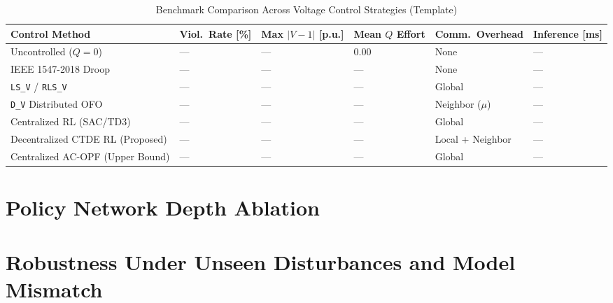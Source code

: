 \begin{table}[!htbp]
\centering
\caption{Benchmark Comparison Across Voltage Control Strategies (Template)}
\label{tab:benchmark_template}
\small
\renewcommand{\arraystretch}{1.12}
\begin{tabularx}{\textwidth}{lYYYYY}
\toprule
\textbf{Control Method} & \textbf{Viol.\ Rate [\%]} & \textbf{Max $|V - 1|$ [p.u.]} & \textbf{Mean $Q$ Effort} & \textbf{Comm.\ Overhead} & \textbf{Inference [ms]} \\
\midrule
Uncontrolled ($Q = 0$) & --- & --- & 0.00 & None & --- \\
IEEE 1547-2018 Droop~\cite{IEEE1547_2018,Satsangi2022} & --- & --- & --- & None & --- \\
\texttt{LS\_V} / \texttt{RLS\_V}~\cite{Mughni2026} & --- & --- & --- & Global & --- \\
\texttt{D\_V} Distributed OFO~\cite{Mughni2026,Ortmann2020} & --- & --- & --- & Neighbor ($\mu$) & --- \\
Centralized RL (SAC/TD3) & --- & --- & --- & Global & --- \\
Decentralized CTDE RL (Proposed) & --- & --- & --- & Local + Neighbor & --- \\
Centralized AC-OPF (Upper Bound) & --- & --- & --- & Global & --- \\
\bottomrule
\end{tabularx}
\end{table}

\section{Policy Network Depth Ablation}

\section{Robustness Under Unseen Disturbances and Model Mismatch}
